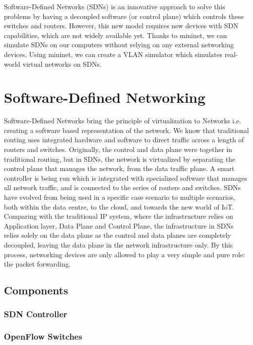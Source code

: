 \documentclass[conference]{IEEEtran}
\begin{document}
    \noindent
    Software-Defined Networks (SDNs) is an innovative approach to solve this problems by having a decoupled software (or control plane) which controls these switches and routers. However, this new model requires new devices with SDN capabilities, which are not widely available yet. Thanks to mininet, we can simulate SDNs on our computers without relying on any external networking devices. Using mininet, we can create a VLAN simulator which simulates real-world virtual networks on SDNs.

\section{\textbf{Software-Defined Networking}}
    Software-Defined Networks bring the principle of virtualization to Networks i.e. creating a software based representation of the network. We know that traditional routing uses integrated hardware and software to direct traffic across a length of routers and switches. Originally, the control and data plane were together in traditional routing, but in SDNs, the network is virtualized by separating the control plane that manages the network, from the data traffic plane. 
    A smart controller is being run which is integrated with specialized software that manages all network traffic, and is connected to the series of routers and switches. SDNs have evolved from being used in a specific case scenario to multiple scenarios, both within the data centre, to the cloud, and towards the new world of IoT. Comparing with the traditional IP system, where the infrastructure relies on Application layer, Data Plane and Control Plane, the infrastructure in SDNs relies solely on the data plane as the control and data planes are completely decoupled, leaving the data plane in the network infrastructure only. By this process, networking devices are only allowed to play a very simple and pure role: the packet forwarding.\cite{b2}
    
    \subsection{Components}
        \subsubsection{SDN Controller}
        
        \subsubsection{OpenFlow Switches}
        
\end{document}

